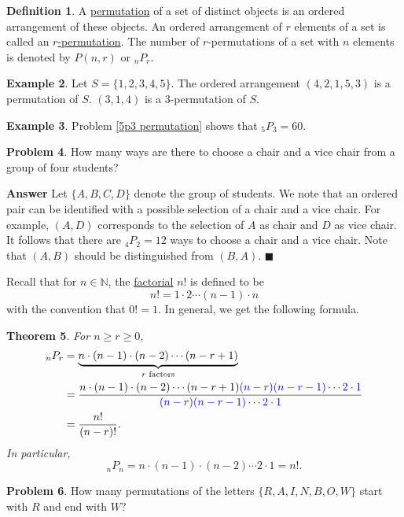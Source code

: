 \documentclass[12pt,letterpaper]{book}
\def\blue{\textcolor{blue}}
\numberwithin{equation}{section}
\newtheorem{thm}{\textbf{Theorem}}[section]
\theoremstyle{definition}
\newtheorem{defi}[thm]{\textbf{Definition}}
\newtheorem{problem}[thm]{\textbf{Problem}}
\newtheorem{example}[thm]{\textbf{Example}}
\newenvironment{answer}{\noindent\textbf{Answer}}{\hfill$\blacksquare$\vspace{0.1in}}
\begin{document}
\begin{defi} A \underline{permutation} of a set of distinct objects is an ordered arrangement of these objects. An ordered arrangement of $r$ elements of a set is called an \underline{$r$-permutation}. The number of $r$-permutations of a set with $n$ elements is denoted by $P(n,r)$ or $_nP_r$.
\end{defi}

\begin{example} Let $S=\{1,2,3,4,5\}$. The ordered arrangement $(4,2,1,5,3)$ is a permutation of $S$. $(3,1,4)$ is a $3$-permutation of $S$.
\end{example}

\begin{example} Problem \ref{5p3 permutation} shows that $_5P_3=60$.
\end{example}

\begin{problem} How many ways are there to choose a chair and a vice chair from a group of four students?
\end{problem}

\begin{answer}
Let $\{A,B,C,D\}$ denote the group of students. We note that an ordered pair can be identified with a possible selection of a chair and a vice chair. For example, $(A,D)$ corresponds to the selection of $A$ as chair and $D$ as vice chair. It follows that there are $_4P_2=12$ ways to choose a chair and a vice chair. Note that $(A,B)$ should be distinguished from $(B,A)$.
\end{answer}

Recall that for $n\in \mathbb{N}$, the \underline{factorial} $n!$ is defined to be
$$n!=1\cdot 2\cdots (n-1)\cdot n $$ with the convention that $0!=1$. In general, we get the following formula.

\begin{thm} For $n\geq r\geq 0$,
\begin{align*}_nP_r&=\underbrace{n\cdot(n-1)\cdot(n-2)\cdots(n-r+1)}_{r\textrm{ factors}}\\
&=\frac{n\cdot(n-1)\cdot(n-2)\cdots(n-r+1)\blue{(n-r)(n-r-1)\cdots 2\cdot 1}}{\blue{(n-r)(n-r-1)\cdots 2\cdot 1}}\\
&=\frac{n!}{(n-r)!}.
\end{align*}
In particular,
$$_nP_n=n\cdot(n-1)\cdot(n-2)\cdots 2 \cdot 1 = n!.$$
\end{thm}

\begin{problem}
How many permutations of the letters $\{R,A,I,N,B,O,W\}$ start with $R$ and end with $W$?
\end{problem}
\end{document}
